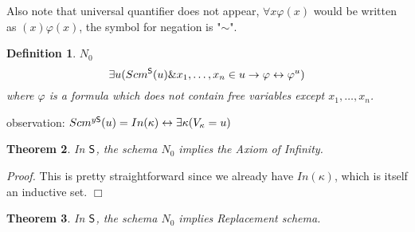 \documentclass[12pt,a4paper]{article}
\newtheorem{theorem}{Theorem}[section]
\newtheorem{definition}[theorem]{Definition}
\newenvironment{proof}
{\noindent \textit{Proof.}}
{\hspace*{\fill} $\Box$}
\renewcommand{\iff}{\leftrightarrow}
\newcommand{\then}{\rightarrow}
\begin{document}
Also note that universal quantifier does not appear, $\forall x \varphi (x)$ would be written as $(x) \varphi (x)$, the symbol for negation is "$\sim$".



\begin{definition}{$N_0$}
\begin{equation}
\exists u (Scm^{\sf{S}}(u) \& x_1, \ldots , x_n \in u \then \varphi \iff \varphi^{u})
\end{equation}
where $\varphi$ is a formula which does not contain free variables except $x_1, \ldots , x_n$.
\end{definition}

observation: $Scm^{y\sf{S}}(u) = In(\kappa) \iff \exists \kappa (V_\kappa = u)$

\begin{theorem}
In $\sf{S}$, the schema $N_0$ implies the Axiom of Infinity.
\end{theorem}

\begin{proof}
This is pretty straightforward since we already have $In(\kappa)$, which is itself an inductive set. %
\end{proof}


\begin{theorem}
In $\sf{S}$, the schema $N_0$ implies Replacement schema.
\end{theorem}
\end{document}
